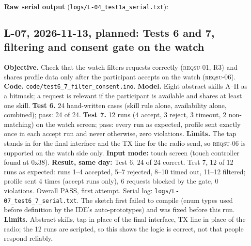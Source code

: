 \IfFileExists{IEEEtran.cls}{\documentclass[conference]{IEEEtran}}{\documentclass[10pt,twocolumn]{article}}
\newcommand{\req}[1]{\textsc{reqsu-}#1}
\begin{document}
\textbf{Raw serial output} (\texttt{logs/L-04\_test1a\_serial.txt}):
{\fontsize{5.5}{6.5}\selectfont}

\subsection*{L-07, 2026-11-13, planned: Tests 6 and 7, filtering and consent gate on the watch}
\textbf{Objective.} Check that the watch filters requests correctly (\req{01}, R3) and shares profile data only after the participant accepts on the watch (\req{06}). \textbf{Code.} \texttt{code/test6\_7\_filter\_consent.ino}. \textbf{Model.} Eight abstract skills A--H as a bitmask; a request is relevant if the participant is available and shares at least one skill. \textbf{Test 6.} 24 hand-written cases (skill rule alone, availability alone, combined); pass: 24 of 24. \textbf{Test 7.} 12 runs (4 accept, 3 reject, 3 timeout, 2 non-matching) on the watch screen; pass: every run as expected, profile sent exactly once in each accept run and never otherwise, zero violations. \textbf{Limits.} The tap stands in for the final interface and the TX line for the radio send, so \req{06} is supported on the watch side only. \textbf{Input mode:} touch screen (touch controller found at 0x38). \textbf{Result, same day:} Test 6, 24 of 24 correct. Test 7, 12 of 12 runs as expected: runs 1--4 accepted, 5--7 rejected, 8--10 timed out, 11--12 filtered; profile sent 4 times (accept runs only), 6 requests blocked by the gate, 0 violations. Overall PASS, first attempt. Serial log: \texttt{logs/L-07\_test6\_7\_serial.txt}. The sketch first failed to compile (enum types used before definition by the IDE's auto-prototypes) and was fixed before this run. \textbf{Limits.} Abstract skills, tap in place of the final interface, TX line in place of the radio; the 12 runs are scripted, so this shows the logic is correct, not that people respond reliably.
\end{document}

